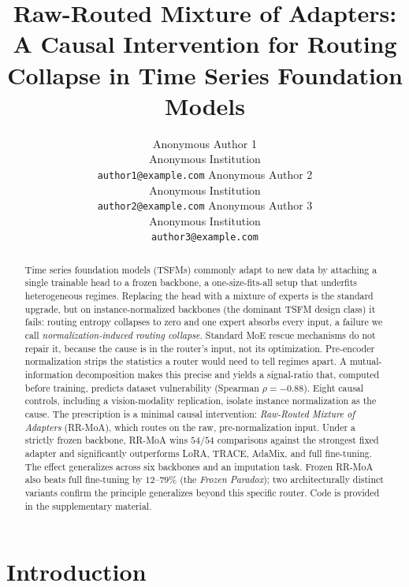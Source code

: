 \documentclass{article}
\title{Raw-Routed Mixture of Adapters: A Causal Intervention for Routing Collapse in Time Series Foundation Models}
\author{
  Anonymous Author 1 \\
  Anonymous Institution\\
  \texttt{author1@example.com}
  \And
  Anonymous Author 2 \\
  Anonymous Institution\\
  \texttt{author2@example.com}
  \And
  Anonymous Author 3 \\
  Anonymous Institution\\
  \texttt{author3@example.com}
}
\begin{document}
\maketitle

\begin{abstract}
Time series foundation models (TSFMs) commonly adapt to new data by attaching a single trainable head to a frozen backbone, a one-size-fits-all setup that underfits heterogeneous regimes. Replacing the head with a mixture of experts is the standard upgrade, but on instance-normalized backbones (the dominant TSFM design class) it fails: routing entropy collapses to zero and one expert absorbs every input, a failure we call \emph{normalization-induced routing collapse}. Standard MoE rescue mechanisms do not repair it, because the cause is in the router's input, not its optimization. Pre-encoder normalization strips the statistics a router would need to tell regimes apart. A mutual-information decomposition makes this precise and yields a signal-ratio that, computed before training, predicts dataset vulnerability (Spearman $\rho{=}{-}0.88$). Eight causal controls, including a vision-modality replication, isolate instance normalization as the cause. The prescription is a minimal causal intervention: \emph{Raw-Routed Mixture of Adapters} (RR-MoA), which routes on the raw, pre-normalization input. Under a strictly frozen backbone, RR-MoA wins $54/54$ comparisons against the strongest fixed adapter and significantly outperforms LoRA, TRACE, AdaMix, and full fine-tuning. The effect generalizes across six backbones and an imputation task. Frozen RR-MoA also beats full fine-tuning by $12$--$79\%$ (the \emph{Frozen Paradox}); two architecturally distinct variants confirm the principle generalizes beyond this specific router. Code is provided in the supplementary material.
\end{abstract}

\section{Introduction}
\label{sec:intro}
\end{document}
